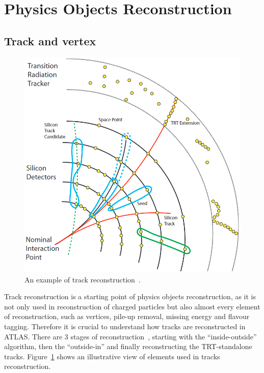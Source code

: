 \section{Physics Objects Reconstruction}
\subsection{Track and vertex}
\begin{figure}[bht]
    \begin{centering}	
    \includegraphics[width=.8\textwidth]{Reconstruction_plots/track.png}
    \caption{An example of track reconstruction~\cite{ATLAS-CONF-2010-072}.
        }
    \label{fig:track_recon}
    \end{centering}
\end{figure}
Track reconstruction is a starting point of physics objects reconstruction,
as it is not only used in reconstruction of charged particles but also
almost every element of reconstruction, such as vertices, pile-up removal,
missing energy and flavour tagging. 
Therefore it is crucial to understand how tracks are reconstructed in ATLAS.
There are 3 stages of reconstruction~\cite{ATLAS-CONF-2012-042}, 
starting with the ``inside-outside''
algorithm, then the ``outside-in'' and finally reconstructing the
TRT-standalone tracks. Figure~\ref{fig:track_recon} shows an illustrative 
view of elements used in tracks reconstruction.

